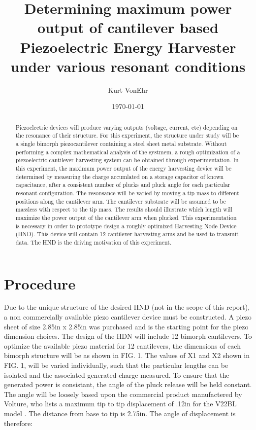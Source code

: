 \documentclass[aps,prl,twocolumn,groupedaddress]{revtex4}
\begin{document}
\title{Determining maximum power output of cantilever based Piezoelectric Energy Harvester under various resonant conditions}


\author{Kurt VonEhr}

\date{\today}

\begin{abstract}

Piezoelectric devices will produce varying outputs (voltage, current, etc) depending on the resonance of their structure. For this experiment, the structure under study will be a single bimorph piezocantilever containing a steel sheet metal substrate. Without performing a complex mathematical analysis of the systmem, a rough optimization of a piezoelectric cantilever harvesting system can be obtained through experimentation. In this experiment, the maximum power output of the energy harvesting device will be determined by measuring the charge accumlated on a storage capacitor of known capacitance, after a consistent number of plucks and pluck angle for each particular resonant configuration. The resonsance will be varied by moving a tip mass to different positions along the cantilever arm. The cantilever substrate will be assumed to be massless with respect to the tip mass. The results should illustrate which length will maximize the power output of the cantilever arm when plucked. This experimentation is necessary in order to prototype design a roughly optimized Harvesting Node Device (HND). This device will contain 12 cantilever harvesting arms and be used to transmit data. The HND is the driving motivation of this experiment. 
\end{abstract}
 
\maketitle

\section{Procedure}

Due to the unique structure of the desired HND (not in the scope of this report), a non commercially available piezo cantilever device must be constructed. A piezo sheet of size 2.85in x 2.85in was purchased and is the starting point for the piezo dimension choices. The design of the HDN will include 12 bimorph cantilevers. To optimize the available piezo material for 12 cantilevers,  the dimensions of each bimorph structure will be as shown in FIG. 1. The values of X1 and X2 shown in FIG. 1, will be varied individually, such that the particular lengths can be isolated and the associated generated charge measured. To ensure that the generated power is consistant, the angle of the pluck release will be held constant. The angle will be loosely based upon the commercial product manufactered by Volture, who lists a maximum tip to tip displacement of .12in for the V22BL model \footnotemark{}. The distance from base to tip is 2.75in. The angle of displacement is therefore: 
\end{document}
